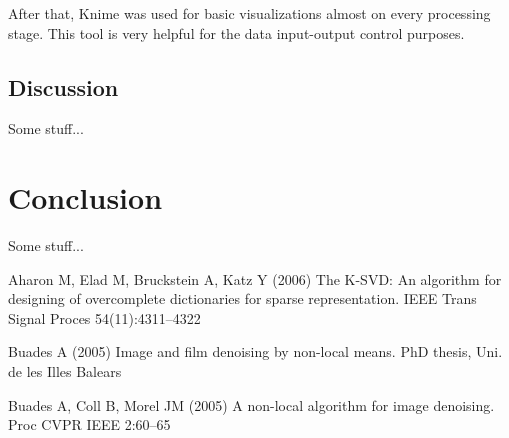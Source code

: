 \documentclass[]{article}
\begin{document}
After that, Knime was used for basic visualizations almost on every processing stage. This tool is very helpful for the data input-output control purposes.
% 
\subsection{Discussion}
%
Some stuff...
%
\section{Conclusion}
%
Some stuff...
%
%
\begin{thebibliography}{99}
%


Aharon M, Elad M, Bruckstein A, Katz Y (2006)
The K-SVD: An algorithm for designing of overcomplete dictionaries for sparse representation.
IEEE Trans Signal Proces 54(11):4311–4322

Buades A (2005)
Image and film denoising by non-local means. PhD thesis, Uni. de les Illes Balears

Buades A, Coll B, Morel JM (2005)
A non-local algorithm for image denoising.
Proc CVPR IEEE 2:60–65

\end{thebibliography}
\end{document}
